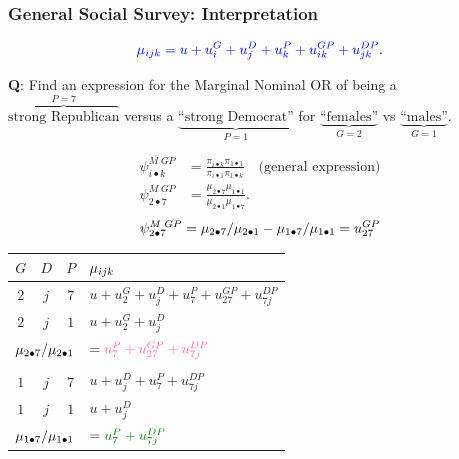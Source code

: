 \documentclass[oneside]{book}\usepackage[]{graphicx}\usepackage[svgnames]{xcolor}
\let\log\relax%
\begin{document}
\subsubsection*{General Social Survey: Interpretation}
\[ \textcolor{Blue}{\log{\mu_{ijk}}=u+u_i^G+u_j^D+u_k^P+u_{ik}^{GP}+u_{jk}^{DP}}. \]
\begin{Example}{}
    \textbf{Q}: Find an expression for the Marginal Nominal OR of being a $ \overbrace{\text{strong Republican}}^{P=7} $
    versus a $ \underbrace{\text{``strong Democrat''}}_{P=1} $ for $ \underbrace{\text{``females''}}_{G=2} $ vs $ \underbrace{\text{``males''}}_{G=1} $.
\end{Example}
\begin{align*}
    \psi_{i\bullet k}^{M\; GP} & =\frac{\pi_{i\bullet k}\pi_{1\bullet 1}}{\pi_{i\bullet 1}\pi_{1\bullet k}}\quad\text{(general expression)} \\
    \psi_{2\bullet 7}^{M\; GP} & =\frac{\mu_{2\bullet 7}\mu_{1\bullet 1}}{\mu_{2\bullet 1}\mu_{1\bullet 7}}.
\end{align*}
\[ \log{\psi_{2\bullet 7}^{M\; GP}}=\log{\mu_{2\bullet 7}/\mu_{2\bullet 1}}-\log{\mu_{1\bullet 7}/\mu_{1\bullet 1}}=u_{27}^{GP} \]
\begin{table}[H]
    \centering
    \begin{tabular}{cccl}
        $ G $                                                           & $ D $                                                   & $ P $ & $ \log{\mu_{ijk}} $                             \\
        \midrule
        $ 2 $                                                           & $ j $                                                   & $ 7 $ & $ u+u_2^G+u_j^D+u_7^P+u_{27}^{GP}+u_{7j}^{DP} $ \\
        $ 2 $                                                           & $ j $                                                   & $ 1 $ & $ u+u_2^G+u_j^D $                               \\
        \midrule
        \multicolumn{3}{c}{$ \log{\mu_{2\bullet 7}/\mu_{2\bullet 1}} $} & $ =\textcolor{HotPink}{u_7^P+u_{27}^{GP}+u_{7j}^{DP}} $                                                           \\\\
        \midrule
        $ 1 $                                                           & $ j $                                                   & $ 7 $ & $ u+u_j^D+u_7^P+u_{7j}^{DP} $                   \\
        $ 1 $                                                           & $ j $                                                   & $ 1 $ & $ u+u_j^D $                                     \\
        \midrule
        \multicolumn{3}{c}{$ \log{\mu_{1\bullet 7}/\mu_{1\bullet 1}} $} & $ =\textcolor{Green}{u_7^P+u_{7j}^{DP}} $
    \end{tabular}
\end{table}
\end{document}
